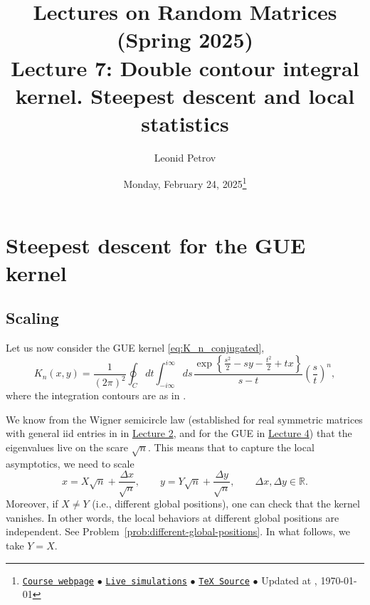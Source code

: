 \documentclass[letterpaper,11pt,oneside,reqno]{article}
\numberwithin{equation}{section}
\newcommand{\ssp}{\hspace{1pt}}
\theoremstyle{definition}
\begin{document}
\title{Lectures on Random Matrices
(Spring 2025)
\\Lecture 7: Double contour integral kernel. Steepest descent and local statistics}


\date{Monday, February 24, 2025\footnote{\href{https://lpetrov.cc/rmt25/}{\texttt{Course webpage}}
$\bullet$ \href{https://lpetrov.cc/simulations/model/random-matrices/}{\texttt{Live simulations}}
$\bullet$ \href{https://lpetrov.cc/rmt25/rmt25-notes/rmt2025-l07.tex}{\texttt{TeX Source}}
$\bullet$
Updated at \currenttime, \today}}



\author{Leonid Petrov}


\maketitle
\tableofcontents


\section{Steepest descent for the GUE kernel}
\label{sec:steepest-descent-GUE}

\subsection{Scaling}
\label{sub:scaling}

Let us now consider the GUE kernel
\eqref{eq:K_n_conjugated},
\begin{equation*}
	K_n(x,y)=\frac{1}{(2\pi)^2}
	\oint_C dt\int_{-i\infty}^{i\infty}ds\ssp
	\frac{\exp\left\{ \frac{s^2}{2}-sy-\frac{t^2}{2}+tx \right\}}{s-t}\left( \frac{s}{t} \right)^n
	,
\end{equation*}
where the integration contours are as in .

We know from the Wigner semicircle law
(established for real symmetric matrices with general iid entries in
in \href{https://lpetrov.cc/rmt25/rmt25-notes/rmt2025-l02.pdf}{Lecture 2},
and for the GUE in \href{https://lpetrov.cc/rmt25/rmt25-notes/rmt2025-l04.pdf}{Lecture 4})
that the eigenvalues live on the scare $\sqrt n$. This means that to capture the local asymptotics,
we need to scale
\begin{equation}
	\label{eq:scaling_x-y}
	x=X\sqrt n+\frac{\Delta x}{\sqrt n},\qquad y=Y\sqrt n+\frac{\Delta y}{\sqrt n},\qquad
	\Delta x,\Delta y\in\mathbb{R}.
\end{equation}
Moreover, if $X\ne Y$ (i.e., different global positions), one can check that the kernel
vanishes. In other words, the local behaviors at different global positions are independent.
See Problem~\ref{prob:different-global-positions}.
In what follows, we take $Y=X$.
\end{document}
